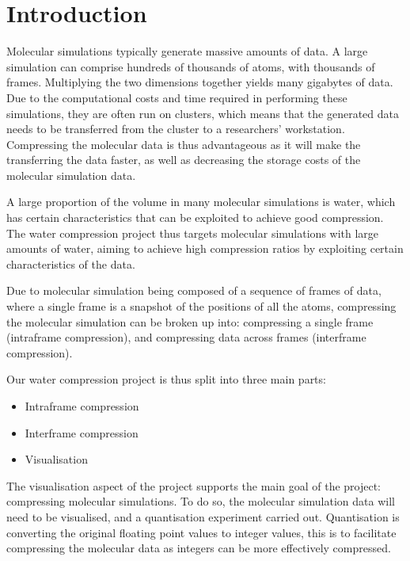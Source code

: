 \chapter{Introduction}
\label{cha:introduction}

Molecular simulations typically generate massive amounts of data. A large
simulation can comprise hundreds of thousands of atoms, with thousands of
frames.  Multiplying the two dimensions together yields many gigabytes of data.
Due to the computational costs and time required in performing these
simulations, they are often run on clusters, which means that the generated
data needs to be transferred from the cluster to a researchers' workstation.
Compressing the molecular data is thus advantageous as it will make the
transferring the data faster, as well as decreasing the storage costs of the
molecular simulation data.

A large proportion of the volume in many molecular simulations is water, which
has certain characteristics that can be exploited to achieve good compression.
The water compression project thus targets molecular simulations with large
amounts of water, aiming to achieve high compression ratios by exploiting
certain characteristics of the data.

Due to molecular simulation being composed of a sequence of frames of data,
where a single frame is a snapshot of the positions of all the atoms,
compressing the molecular simulation can be broken up into: compressing a
single frame (intraframe compression), and compressing data across frames
(interframe compression).

Our water compression project is thus split into three main parts:

\begin{itemize}
  \item Intraframe compression
  \item Interframe compression
  \item Visualisation
\end{itemize}

The visualisation aspect of the project supports the main goal of the project:
compressing molecular simulations. To do so, the molecular simulation data will
need to be visualised, and a quantisation experiment carried out. Quantisation
is converting the original floating point values to integer values, this is to
facilitate compressing the molecular data as integers can be more effectively
compressed.

